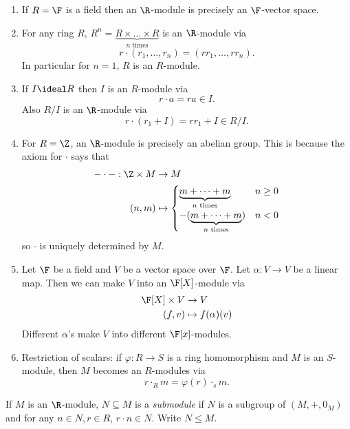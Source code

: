 \documentclass[a4paper]{article}
\begin{document}
\begin{eg}\leavevmode
  \begin{enumerate}
  \item If \(R = \F\) is a field then an \(\R\)-module is precisely an \(\F\)-vector space.
  \item For any ring \(R\), \(R^n = \underbrace{R \times \dots \times R}_{n \text{ times}}\) is an \(\R\)-module via
    \[
      r \cdot (r_1, \dots, r_n) = (rr_1, \dots, rr_n).
    \]
    In particular for \(n = 1\), \(R\) is an \(R\)-module.
  \item If \(I \ideal R\) then \(I\) is an \(R\)-module via
    \[
      r \cdot a = ra \in I.
    \]
    Also \(R/I\) is an \(\R\)-module via
    \[
      r \cdot (r_1 + I) = rr_1 + I \in R/I.
    \]
  \item For \(R = \Z\), an \(\R\)-module is precisely an abelian group. This is because the axiom for \(\cdot\) says that
    \begin{align*}
      - \cdot -: \Z \times M &\to M \\
      (n, m) &\mapsto
               \begin{cases}
                 \underbrace{m + \dots + m}_{n \text{ times}} & n \geq 0 \\
                 -(\underbrace{m + \dots + m}_{n \text{ times}}) & n < 0 \\
               \end{cases}
    \end{align*}
    so \(\cdot\) is uniquely determined by \(M\).
  \item Let \(\F\) be a field and \(V\) be a vector space over \(\F\). Let \(\alpha: V \to V\) be a linear map. Then we can make \(V\) into an \(\F[X]\)-module via
    \begin{align*}
      \F[X] \times V &\to V \\
      (f, v) &\mapsto f(\alpha)(v)
    \end{align*}
    Different \(\alpha\)'s make \(V\) into different \(\F[x]\)-modules.
  \item Restriction of scalars: if \(\varphi: R \to S\) is a ring homomorphism and \(M\) is an \(S\)-module, then \(M\) becomes an \(R\)-modules via
    \[
      r \cdot_R m = \varphi(r) \cdot_s m.
    \]
  \end{enumerate}
\end{eg}

\begin{definition}[Submodule]
  If \(M\) is an \(\R\)-module, \(N \subseteq M\) is a \emph{submodule} if \(N\) is a subgroup of \((M, +, 0_M)\) and for any \(n \in N, r \in R\), \(r \cdot n \in N\). Write \(N \leq M\).
\end{definition}
\end{document}
